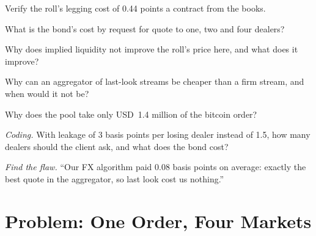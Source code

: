 \begin{exercise}[$\star$]\label{exo:mx:execution-beyond-equities:2}
Verify the roll's legging cost of 0.44 points a contract from the books.
\end{exercise}

\begin{exercise}[$\star$]\label{exo:mx:execution-beyond-equities:3}
What is the bond's cost by request for quote to one, two and four dealers?
\end{exercise}

\begin{exercise}[$\star\star$]\label{exo:mx:execution-beyond-equities:4}
Why does implied liquidity not improve the roll's price here, and what does it improve?
\end{exercise}

\begin{exercise}[$\star\star$]\label{exo:mx:execution-beyond-equities:5}
Why can an aggregator of last-look streams be cheaper than a firm stream, and when would it not be?
\end{exercise}

\begin{exercise}[$\star\star$]\label{exo:mx:execution-beyond-equities:6}
Why does the pool take only USD~1.4 million of the bitcoin order?
\end{exercise}

\begin{exercise}[$\star\star\star$]\label{exo:mx:execution-beyond-equities:7}
\emph{Coding.} With leakage of 3 basis points per losing dealer instead of 1.5, how many dealers should the client ask, and what does the bond cost?
\end{exercise}

\begin{exercise}[$\star\star\star$]\label{exo:mx:execution-beyond-equities:8}
\emph{Find the flaw.} ``Our FX algorithm paid 0.08 basis points on average: exactly the best quote in the aggregator, so last look cost us nothing.''
\end{exercise}

\section{Problem: One Order, Four Markets}

